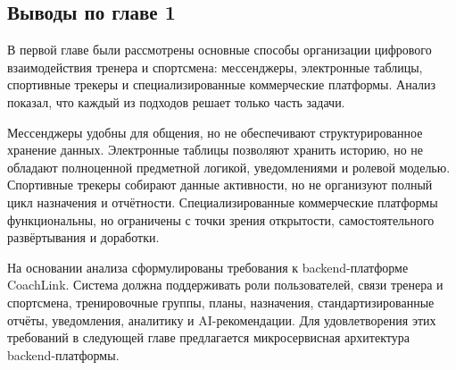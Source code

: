 \subsection{Выводы по главе 1}

В первой главе были рассмотрены основные способы организации цифрового взаимодействия тренера и спортсмена: мессенджеры, электронные таблицы, спортивные трекеры и специализированные коммерческие платформы. Анализ показал, что каждый из подходов решает только часть задачи.

Мессенджеры удобны для общения, но не обеспечивают структурированное хранение данных. Электронные таблицы позволяют хранить историю, но не обладают полноценной предметной логикой, уведомлениями и ролевой моделью. Спортивные трекеры собирают данные активности, но не организуют полный цикл назначения и отчётности. Специализированные коммерческие платформы функциональны, но ограничены с точки зрения открытости, самостоятельного развёртывания и доработки.

На основании анализа сформулированы требования к backend-платформе CoachLink. Система должна поддерживать роли пользователей, связи тренера и спортсмена, тренировочные группы, планы, назначения, стандартизированные отчёты, уведомления, аналитику и AI-рекомендации. Для удовлетворения этих требований в следующей главе предлагается микросервисная архитектура backend-платформы.

